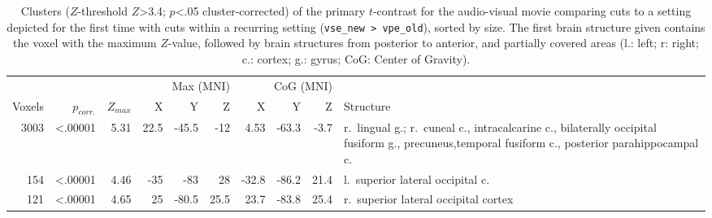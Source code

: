 \documentclass[english]{article}
\begin{document}
\begin{table*}[tbp]
\caption{Clusters ($Z$-threshold $Z$>3.4; $p$<.05 cluster-corrected)
    of the primary $t$-contrast for the audio-visual movie comparing cuts to a
    setting depicted for the first time with cuts within a recurring setting
    (\texttt{vse\_new > vpe\_old}), sorted by size.
    The first brain structure given contains the voxel with the maximum $Z$-value,
    followed by brain structures from posterior to anterior, and partially
    covered areas (l.: left; r: right; c.: cortex; g.: gyrus; CoG: Center of
  Gravity).}
\label{tab:res-av-group1}
\small
\begin{tabular}{rrrrrrrrrp{4.7cm}}
\toprule
& & & \multicolumn{3}{r}{Max (MNI)} & \multicolumn{3}{r}{CoG (MNI)} &
\\ \cmidrule{4-6} \cmidrule{7-9}
Voxels & $p_{corr.}$ & $Z_{max}$ & X & Y & Z  & X & Y & Z & Structure \\
\midrule
3003 & <.00001 & 5.31 & 22.5 & -45.5 & -12 & 4.53 & -63.3 & -3.7 & r.~lingual g.; r.~cuneal c., intracalcarine c., bilaterally occipital fusiform g., precuneus,temporal fusiform c., posterior parahippocampal c.  \\
154 & <.00001 & 4.46 & -35 & -83 & 28 & -32.8 & -86.2 & 21.4 & l.~superior
lateral occipital c. \\ %
121 & <.00001 & 4.65 & 25 & -80.5 & 25.5 & 23.7 & -83.8 & 25.4 & r.~superior
lateral occipital cortex \\ %
\bottomrule
\end{tabular}
\end{table*}
\end{document}
